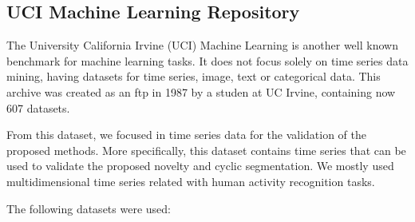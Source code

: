 \subsection{UCI Machine Learning Repository}
\label{subsec:uci}

The University California Irvine (UCI) Machine Learning is another well known benchmark for machine learning tasks. It does not focus solely on time series data mining, having datasets for time series, image, text or categorical data. This archive was created as an ftp in 1987 by a studen at UC Irvine, containing now 607 datasets. 
\par
From this dataset, we focused in time series data for the validation of the proposed methods. More specifically, this dataset contains time series that can be used to validate the proposed novelty and cyclic segmentation. We mostly used multidimensional time series related with human activity recognition tasks.
\par
The following datasets were used:
